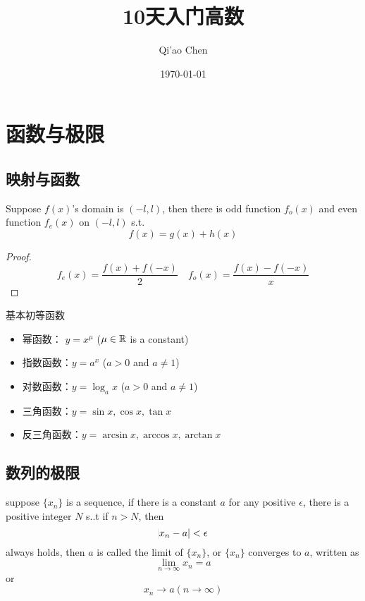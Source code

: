 \documentclass[11pt]{article}
\author{Qi'ao Chen}
\date{\today}
\title{10天入门高数}
\begin{document}
\maketitle
\tableofcontents \clearpage
\section{函数与极限}
\label{sec:org6c69452}
\subsection{映射与函数}
\label{sec:org28238f0}
\begin{proposition}[]
Suppose \(f(x)\)'s domain is \((-l,l)\), then there is odd function
\(f_o(x)\) and even function \(f_e(x)\) on \((-l,l)\) s.t.
\begin{equation*}
f(x)=g(x)+h(x)
\end{equation*}
\end{proposition}

\begin{proof}
\begin{equation*}
f_e(x)=\frac{f(x)+f(-x)}{2}\quad
f_o(x)=\frac{f(x)-f(-x)}{x}
\end{equation*}
\end{proof}

基本初等函数
\begin{itemize}
\item 幂函数： \(y=x^\mu\) (\(\mu\in\mathbb{R}\) is a constant)
\item 指数函数：\(y=a^x\) (\(a\iffalse<\fi>0\) and \(a\neq1\))
\item 对数函数：\(y=\log_ax\) (\(a>0\) and \(a\neq1\))
\item 三角函数：\(y=\sin x,\cos x,\tan x\)
\item 反三角函数：\(y=\arcsin x,\arccos x,\arctan x\)
\end{itemize}
\subsection{数列的极限}
\label{sec:org1900f15}
\begin{definition}[]
suppose \(\{x_n\}\) is a sequence, if there is a constant \(a\) for any
positive \(\epsilon\), there is a positive integer \(N\) s..t if \(n>N\), then
\begin{equation*}
\abs{x_n-a}<\epsilon
\end{equation*}
always holds, then \(a\) is called the limit of \(\{x_n\}\), or \(\{x_n\}\)
converges to \(a\), written as
\begin{equation*}
\lim_{n\to\infty}x_n=a
\end{equation*}
or
\begin{equation*}
x_n\to a(n\to \infty)
\end{equation*}
\end{definition}
\end{document}
